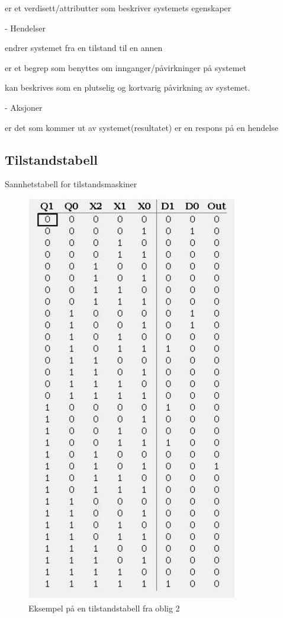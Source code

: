 \documentclass{article}
\begin{document}
	er et verdisett/attributter som beskriver systemets egenskaper
	
	- Hendelser
	
	endrer systemet fra en tilstand til en annen
	
	er et begrep som benyttes om innganger/påvirkninger på 
	systemet 

	kan beskrives som en plutselig og kortvarig påvirkning av 
	systemet. 
	
	- Aksjoner
	
	er det som kommer ut av systemet(resultatet)
	er en respons på en hendelse 

	
	\subsection*{Tilstandstabell}
	Sannhetstabell for tilstandsmaskiner
	
	
	\begin{figure}[H]
		\includegraphics[scale = 0.6]{ekstil.jpg}
		\caption{Eksempel på en tilstandstabell fra oblig 2}
	\end{figure}
	
\end{document}
